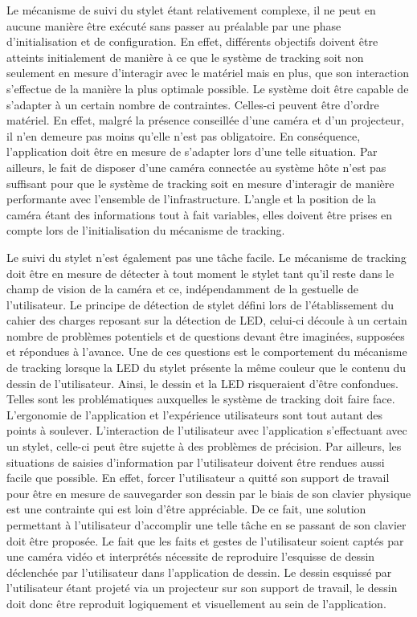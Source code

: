 \documentclass[11pt,a4paper,oldfontcommands]{memoir}
\begin{document}
Le mécanisme de suivi du stylet étant relativement complexe, il ne peut en aucune manière être exécuté sans passer au préalable par une phase d'initialisation et de configuration. En effet, différents objectifs doivent être atteints initialement de manière à ce que le système de tracking soit non seulement en mesure d'interagir avec le matériel mais en plus, que son interaction s'effectue de la manière la plus optimale possible. Le système doit être capable de s'adapter à un certain nombre de contraintes. Celles-ci peuvent être d'ordre matériel. En effet, malgré la présence conseillée d'une caméra et d'un projecteur, il n'en demeure pas moins qu'elle n'est pas obligatoire. En conséquence, l'application doit être en mesure de s'adapter lors d'une telle situation. Par ailleurs, le fait de disposer d'une caméra connectée au système hôte n'est pas suffisant pour que le système de tracking soit en mesure d'interagir de manière performante avec l'ensemble de l'infrastructure. L'angle et la position de la caméra étant des informations tout à fait variables, elles doivent être prises en compte lors de l'initialisation du mécanisme de tracking.

Le suivi du stylet n'est également pas une tâche facile. Le mécanisme de tracking doit être en mesure de détecter à tout moment le stylet tant qu'il reste dans le champ de vision de la caméra et ce, indépendamment de la gestuelle de l'utilisateur. Le principe de détection de stylet défini lors de l'établissement du cahier des charges reposant sur la détection de LED, celui-ci découle à un certain nombre de problèmes potentiels et de questions devant être imaginées, supposées et répondues à l'avance. Une de ces questions est le comportement du mécanisme de tracking lorsque la LED du stylet présente la même couleur que le contenu du dessin de l'utilisateur. Ainsi, le dessin et la LED risqueraient d'être confondues. Telles sont les problématiques auxquelles le système de tracking doit faire face. L'ergonomie de l'application et l'expérience utilisateurs sont tout autant des points à soulever. L'interaction de l'utilisateur avec l'application s'effectuant avec un stylet, celle-ci peut être sujette à des problèmes de précision. Par ailleurs, les situations de saisies d'information par l'utilisateur doivent être rendues aussi facile que possible. En effet, forcer l'utilisateur a quitté son support de travail pour être en mesure de sauvegarder son dessin par le biais de son clavier physique est une contrainte qui est loin d'être appréciable. De ce fait, une solution permettant à l'utilisateur d'accomplir une telle tâche en se passant de son clavier doit être proposée. Le fait que les faits et gestes de l'utilisateur soient captés par une caméra vidéo et interprétés nécessite de reproduire l'esquisse de dessin déclenchée par l'utilisateur dans l'application de dessin. Le dessin esquissé par l'utilisateur étant projeté via un projecteur sur son support de travail, le dessin doit donc être reproduit logiquement et visuellement au sein de l'application.
\end{document}
